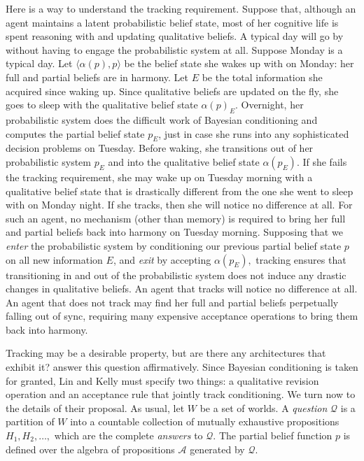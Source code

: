 Here is a  way to understand the tracking requirement. Suppose that, although an
agent maintains a latent probabilistic belief state, most of her cognitive life
is spent reasoning with and updating qualitative beliefs. A typical day will go
by without having to engage the probabilistic system at all. Suppose Monday is a
typical day. Let $\langle \alpha(p), p \rangle$ be the belief state she wakes up
with on Monday: her full and partial beliefs are in harmony. Let $E$ be the
total information she acquired since waking up. Since qualitative beliefs are
updated on the fly, she goes to sleep with the qualitative belief state
$\alpha(p)_E$. Overnight, her probabilistic system does the difficult work of
Bayesian conditioning and computes the partial belief state $p_E$, just in case
she runs into any sophisticated decision problems on Tuesday. Before waking, she
transitions out of her probabilistic system $p_E$ and into the qualitative
belief state $\alpha(p_E)$. If she fails the tracking requirement, she may wake
up on Tuesday morning with a qualitative belief state that is drastically
different from the one she went to sleep with on Monday night. If she tracks,
then she will notice no difference at all. For such an agent, no mechanism
(other than memory) is required to bring her full and partial beliefs back into
harmony on Tuesday morning. Supposing that we {\em enter} the probabilistic
system by conditioning our previous partial belief state $p$ on all new
information $E$, and {\em exit} by accepting $\alpha(p_E),$ tracking ensures
that transitioning in and out of the probabilistic system does not induce any
drastic changes in qualitative beliefs. An agent that tracks will notice no
difference at all. An agent that does not track may find her full and partial
beliefs perpetually falling out of sync, requiring many expensive acceptance
operations to bring them back into harmony. 

Tracking may be a desirable property, but are there any architectures that
exhibit it? \citet{lin2012propositional} answer this question affirmatively.
Since Bayesian conditioning is taken for granted, Lin and Kelly must specify two
things: a qualitative revision operation and an acceptance rule that jointly
track conditioning. We turn now to the details of their proposal.  As usual, let
$W$ be a set of worlds. A {\em question} $\mathcal{Q}$ is a partition of $W$
into a countable collection of mutually exhaustive propositions $H_1, H_2,
\ldots,$ which are the complete {\em answers} to $\mathcal{Q}.$ The partial
belief function $p$ is defined over the algebra of propositions $\mathcal{A}$
generated by $\mathcal{Q}.$ 


